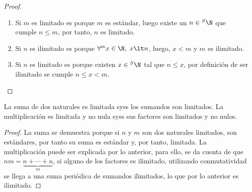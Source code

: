 \documentclass[11pt,oneside,a4paper]{book}
\DeclareMathOperator{\st}{st}
\newcommand{\forallst}{\forall^{\st}}
\begin{document}
\begin{proof}
\begin{enumerate}[$a$)]
\item Si $m$ es limitado es porque $m$ es estándar, luego existe un $n\in{^S\N}$ que cumple $n\leq m$, por tanto, $n$ es limitado.
\item Si $n$ es ilimitado es porque $\forallst x\in\N,\;x\lt n$, luego, $x\lt m$ y $m$ es ilimitado.
\item Si $n$ es limitado es porque existen $x\in{^S\N}$ tal que $n\leq x$, por definición de ser ilimitado se cumple $n\leq x\lt m$.
\end{enumerate}
\end{proof}
\begin{thm}\label{thm:std-sum-prod}
La suma de dos naturales es limitada syss los sumandos son limitados. La multiplicación es limitada y no nula syss sus factores son limitados y no nulos.
\end{thm}
\begin{proof}
La suma se demuestra porque si $n$ y $m$ son dos naturales limitados, son estándares, por tanto su suma es estándar y, por tanto, limitada. La multiplicación puede ser explicada por lo anterior, para ello, se da cuenta de que $nm=\underbrace{n+\cdots+n}_m$, si alguno de los factores es ilimitado, utilizando conmutatividad se llega a una suma periódica de sumandos ilimitados, lo que por lo anterior es ilimitado.
\end{proof}
\end{document}
